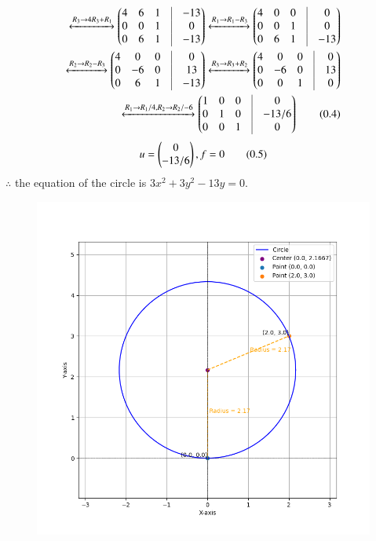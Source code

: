 \documentclass[journal]{IEEEtran}
\begin{document}
\begin{align*}
	\xleftrightarrow[]{R_3 \rightarrow 4R_3+R_1}
	 \myvec{4 & 6 & 1 & \vrule & -13\\
         0 &  0 & 1 & \vrule & 0\\
         0 &  6 & 1 & \vrule & -13} 
	 \xleftrightarrow[]{R_1\rightarrow R_1-R_3}
	 \myvec{4 & 0 & 0 & \vrule & 0\\
	 0 & 0 & 1 & \vrule & 0\\
	 0 & 6 & 1 &\vrule & -13}\\
	 \xleftrightarrow[]{R_2\rightarrow R_2-R_3}
	 \myvec{4 & 0 & 0 &\vrule & 0\\
	 0 & -6 & 0 & \vrule & 13 \\
	 0 & 6 & 1 & \vrule & -13}
	 \xleftrightarrow[]{R_3\rightarrow R_3+R_2}
	 \myvec{4 & 0 & 0 &\vrule & 0\\
	 0 & -6 & 0 & \vrule & 13 \\
	 0 & 0 & 1 & \vrule & 0}\\
	 \xleftrightarrow[]{R_1\rightarrow R_1/4, R_2 \rightarrow R_2/-6}
	 \myvec{1 & 0 & 0 &\vrule & 0\\
         0 & 1 & 0 & \vrule & -13/6 \\
	 0 & 0 & 1 & \vrule & 0} \tag{0.4}
\end{align*}
\begin{align*}
	 u=\begin{pmatrix}0 \\ -13/6\end{pmatrix},f=0 \tag{0.5}
\end{align*}
$\therefore$ the equation of the circle is $3x^2+3y^2-13y=0$.
\begin{table}[h!]    
  \centering
  
	\label{7-7.2-19}
\end{table}
\begin{figure}[h!]
	\centering
	\includegraphics[width=0.7\linewidth]{figs/Fig1.png}
\end{figure}
\end{document}
